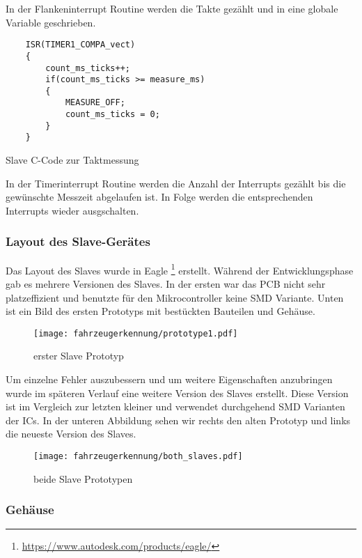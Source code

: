 In der Flankeninterrupt Routine werden die Takte gezählt und in eine globale Variable geschrieben.
\begin{listing}[H]
    \begin{verbatim}
    ISR(TIMER1_COMPA_vect)
    {
        count_ms_ticks++;
        if(count_ms_ticks >= measure_ms)
        {
            MEASURE_OFF;
            count_ms_ticks = 0;
        }
    }
    \end{verbatim}
    \caption{ Slave C-Code zur Taktmessung}
\end{listing}


In der Timerinterrupt Routine werden die Anzahl der Interrupts gezählt bis die gewünschte Messzeit
abgelaufen ist. In Folge werden die entsprechenden Interrupts wieder ausgschalten.
\subsubsection{Layout des Slave-Gerätes}

Das Layout des Slaves wurde in Eagle \footnote{\url{https://www.autodesk.com/products/eagle/}} erstellt. Während der Entwicklungsphase gab es mehrere
Versionen des Slaves. In der ersten war das PCB nicht sehr platzeffizient und benutzte für den
Mikrocontroller keine SMD Variante. Unten ist ein Bild des ersten Prototyps mit bestückten Bauteilen
und Gehäuse.

\begin{figure}[H]
    \centering
    \texttt{[image: fahrzeugerkennung/prototype1.pdf]}
    \caption{erster Slave Prototyp}
\end{figure}

Um einzelne Fehler auszubessern und um weitere Eigenschaften anzubringen wurde im späteren
Verlauf eine weitere Version des Slaves erstellt. Diese Version ist im Vergleich zur letzten kleiner
und verwendet durchgehend SMD Varianten der ICs. In der unteren Abbildung sehen wir rechts
den alten Prototyp und links die neueste Version des Slaves.

\begin{figure}[H]
    \centering
    \texttt{[image: fahrzeugerkennung/both\_slaves.pdf]}
    \caption{beide Slave Prototypen}
\end{figure}


\subsubsection{Gehäuse}\mbox{} 

